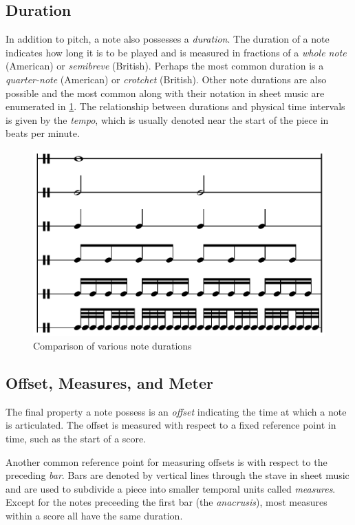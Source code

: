 \subsection{Duration}

In addition to pitch, a note also possesses a \emph{duration}. The duration of
a note indicates how long it is to be played and is measured in fractions of a
\emph{whole note} (American) or \emph{semibreve} (British). Perhaps the most
common duration is a \emph{quarter-note} (American) or \emph{crotchet}
(British). Other note durations are also possible and the most common along
with their notation in sheet music are enumerated in
\cref{fig:note-durations}. The relationship between durations and
physical time intervals is given by the \emph{tempo}, which is usually
denoted near the start of the piece in beats per minute.

\begin{figure}[tb]
    \centering
    \includegraphics[width=0.6\linewidth]{note-durations.png}
    \caption{Comparison of various note durations \citep{wiki-note-durations}}
    \label{fig:note-durations}
\end{figure}

\subsection{Offset, Measures, and Meter}

The final property a note possess is an \emph{offset} indicating the time at
which a note is articulated. The offset is measured with respect to a fixed
reference point in time, such as the start of a score.

Another common reference point for measuring offsets is with respect to the
preceding \emph{bar}. Bars are denoted by vertical lines through the
stave in sheet music and are used to subdivide a piece into smaller temporal
units called \emph{measures}. Except for the notes preceeding the first bar
(\ie the \emph{anacrusis}), most measures within a score all have the same
duration.

